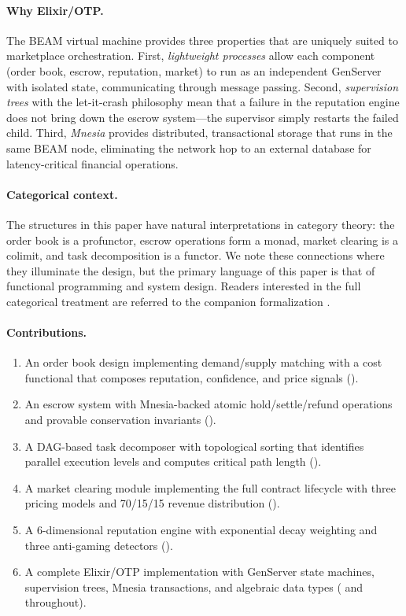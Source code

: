 \documentclass[12pt,a4paper]{article}
\theoremstyle{plain}
\theoremstyle{definition}
\begin{document}
\paragraph{Why Elixir/OTP.} The BEAM virtual machine provides three properties that are uniquely suited to marketplace orchestration. First, \emph{lightweight processes} allow each component (order book, escrow, reputation, market) to run as an independent GenServer with isolated state, communicating through message passing. Second, \emph{supervision trees} with the let-it-crash philosophy mean that a failure in the reputation engine does not bring down the escrow system---the supervisor simply restarts the failed child. Third, \emph{Mnesia} provides distributed, transactional storage that runs in the same BEAM node, eliminating the network hop to an external database for latency-critical financial operations.

\paragraph{Categorical context.} The structures in this paper have natural interpretations in category theory: the order book is a profunctor, escrow operations form a monad, market clearing is a colimit, and task decomposition is a functor. We note these connections where they illuminate the design, but the primary language of this paper is that of functional programming and system design. Readers interested in the full categorical treatment are referred to the companion formalization \cite{long2026categorical}.

\paragraph{Contributions.}
\begin{enumerate}
    \item An order book design implementing demand/supply matching with a cost functional that composes reputation, confidence, and price signals ().
    \item An escrow system with Mnesia-backed atomic hold/settle/refund operations and provable conservation invariants ().
    \item A DAG-based task decomposer with topological sorting that identifies parallel execution levels and computes critical path length ().
    \item A market clearing module implementing the full contract lifecycle with three pricing models and 70/15/15 revenue distribution ().
    \item A 6-dimensional reputation engine with exponential decay weighting and three anti-gaming detectors ().
    \item A complete Elixir/OTP implementation with GenServer state machines, supervision trees, Mnesia transactions, and algebraic data types ( and throughout).
\end{enumerate}
\end{document}
